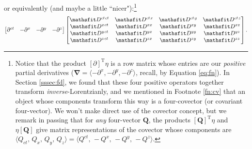 \documentclass[12pt]{article}
\renewcommand{\vv}[1]{\mathbf{#1}}
\newcommand{\del}{\boldsymbol{\nabla}}
\begin{document}
or equivalently (and maybe a little ``nicer"):\footnote{Notice that the product $[\partialup]^\mathrm{T} \eta$ is a row matrix whose entries are our \emph{positive} partial derivatives ($\del = \langle - \partial^x , - \partial^y , - \partial^z \rangle$, recall, by Equation \ref{eq:fn}). In Section \ref{sssec:fd}, we found that these four positive operators together transform \emph{inverse}-Lorentzianly, and we mentioned in Footnote \ref{fn:cv} that an object whose components transform this way is a four-covector (or covariant four-vector). We won't make direct use of the covector concept, but we remark in passing that for \emph{any} four-vector $\vv Q$, the products $[\vv Q]^\mathrm{T} \eta$ and $\eta [\vv Q]$ give matrix representations of the covector whose components are $\langle Q_{ct}, \, Q_x, \, Q_y, \, Q_z \rangle = \langle Q^{ct}, \, -Q^x, \, -Q^y, \, -Q^z \rangle$.}
\begin{equation*}
\begin{bmatrix}
\partial^{ct} & - \partial^x & - \partial^y & -\partial^z
\end{bmatrix}
\begin{bmatrix}
\mathsfit D^{ct \mkern1.5mu ct} & \mathsfit D^{ct \mkern1.5mu x} & \mathsfit D^{ct \mkern1.5mu y} & \mathsfit D^{ct \mkern1.5mu z} \\
\mathsfit D^{x \mkern1.5mu ct} & \mathsfit D^{x x} & \mathsfit D^{x y} & \mathsfit D^{x z}  \\
\mathsfit D^{y \mkern1.5mu ct} & \mathsfit D^{y x} & \mathsfit D^{y y} & \mathsfit D^{y z}  \\
\mathsfit D^{z \mkern1.5mu ct} & \mathsfit D^{z x} & \mathsfit D^{z y} & \mathsfit D^{z z} 
\end{bmatrix}.
\end{equation*}
\end{document}
